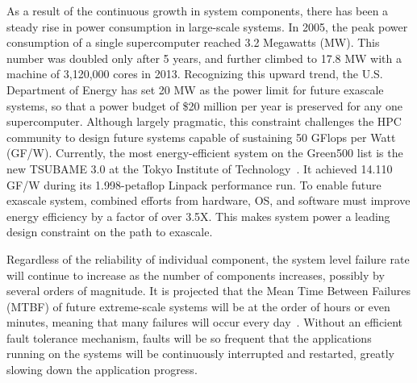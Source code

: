 As a result of the continuous growth in system components, there has been a steady rise in power consumption in large-scale systems. 
In 2005, the peak power consumption of a single supercomputer reached 3.2 Megawatts (MW). This number was doubled only after 5 years, and 
further climbed to 17.8 
MW with a machine of 3,120,000 cores in 2013. Recognizing this upward trend, the U.S. Department of Energy has set 20 
MW as the power limit for future exascale systems, so that a power budget of \$20 million per year is preserved for any one supercomputer. 
Although largely pragmatic, this constraint challenges the HPC community to design future systems capable of sustaining 50 GFlops
per Watt (GF/W). Currently, the most energy-efficient system on the Green500 list is the new TSUBAME 3.0 at the Tokyo Institute 
of Technology~\cite{top500}. It achieved 14.110 GF/W during its 1.998-petaflop Linpack performance run. To enable future exascale system, 
combined efforts from hardware, OS, and software must improve energy efficiency by a factor of over 3.5X. 
This makes system power a leading design constraint on the path to exascale. 



Regardless of the reliability of individual component, the system level failure rate will continue to increase as the number of 
components increases, possibly by several orders of magnitude. It is projected that the Mean Time Between Failures (MTBF) of future extreme-scale systems will be at the order of hours or even minutes, meaning 
that many failures will occur every day~\cite{Bergman08exascalecomputing}. Without an efficient fault tolerance mechanism, faults will be so frequent that the applications running on the 
systems will be continuously interrupted and restarted, greatly slowing down the application progress. 




